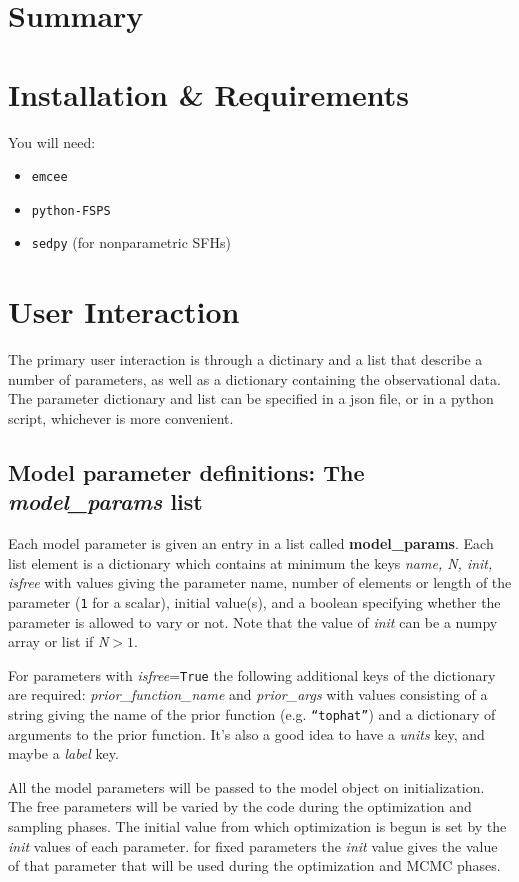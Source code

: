 

\section{Summary}

\section{Installation \& Requirements}
You will need:

\begin{itemize}
\item \texttt{emcee}
\item \texttt{python-FSPS}
\item \texttt{sedpy} (for nonparametric SFHs)
\end{itemize}

\section{User Interaction}
The primary user interaction is through a dictinary and a list that describe a number of parameters, as well as a dictionary containing the observational data.  The parameter dictionary and list can be specified in a json file, or in a python script, whichever is more convenient.

\subsection{Model parameter definitions: The \emph{model_params} list}
Each model parameter is given an entry in a list called {\bf model_params}. Each list element is a dictionary which contains at minimum the keys {\it name, N, init, isfree} with values giving the parameter name, number of elements or length of the parameter (\texttt{1} for a scalar), initial value(s), and a boolean specifying whether the parameter is allowed to vary or not.  Note that the value of {\it init} can be a numpy array or list if {\it N}$>1$.

For parameters with {\it isfree}=\texttt{True} the following additional keys of the dictionary are required: {\it prior_function_name} and {\it prior_args} with values consisting of a string giving the name of the prior function (e.g. \texttt{``tophat''}) and a dictionary of arguments to the prior function. It's also a good idea to have a {\it units} key, and maybe a {\it label} key.

All the model parameters will be passed to the model object on initialization.  The free parameters will be varied by the code during the optimization and sampling phases.  The initial value from which optimization is begun is set by the {\it init} values of each parameter.  for fixed parameters the {\it init} value gives the value of that parameter that will be used during the optimization and MCMC phases.

